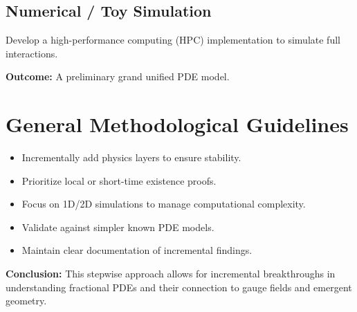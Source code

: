 \documentclass{article}
\begin{document}
\subsection{Numerical / Toy Simulation}
Develop a high-performance computing (HPC) implementation to simulate full interactions.

\textbf{Outcome:} A preliminary grand unified PDE model.

\section{General Methodological Guidelines}

\begin{itemize}
    \item Incrementally add physics layers to ensure stability.
    \item Prioritize local or short-time existence proofs.
    \item Focus on 1D/2D simulations to manage computational complexity.
    \item Validate against simpler known PDE models.
    \item Maintain clear documentation of incremental findings.
\end{itemize}

\textbf{Conclusion:} This stepwise approach allows for incremental breakthroughs in understanding fractional PDEs and their connection to gauge fields and emergent geometry.
\end{document}
